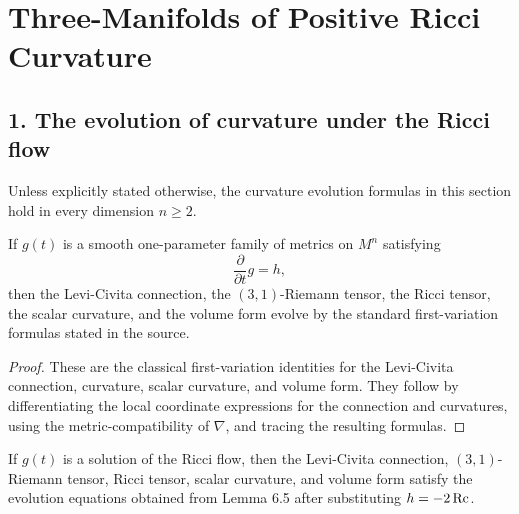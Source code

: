 \chapter{Three-Manifolds of Positive Ricci Curvature}

\section*{1. The evolution of curvature under the Ricci flow}

\begin{remark}
\label{ch06-rem-evolution-formulas-dimension-independent}
Unless explicitly stated otherwise, the curvature evolution formulas in this section hold in every dimension \(n \ge 2\).
\end{remark}

\begin{lemma}
\label{ch06-lem-general-metric-variation}
If \(g(t)\) is a smooth one-parameter family of metrics on \(M^n\) satisfying
\[
\frac{\partial}{\partial t}g=h,
\]
then the Levi-Civita connection, the \((3,1)\)-Riemann tensor, the Ricci tensor, the scalar curvature, and the volume form evolve by the standard first-variation formulas stated in the source.
\end{lemma}

\begin{proof}
These are the classical first-variation identities for the Levi-Civita connection, curvature, scalar curvature, and volume form. They follow by differentiating the local coordinate expressions for the connection and curvatures, using the metric-compatibility of \(\nabla\), and tracing the resulting formulas.
\end{proof}

\begin{corollary}
\label{ch06-cor-curvature-evolution-under-ricci-flow}
If \(g(t)\) is a solution of the Ricci flow, then the Levi-Civita connection, \((3,1)\)-Riemann tensor, Ricci tensor, scalar curvature, and volume form satisfy the evolution equations obtained from Lemma 6.5 after substituting \(h=-2\operatorname{Rc}\).
\end{corollary}

